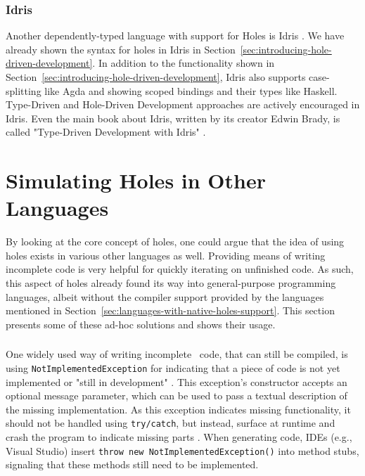 \subsubsection{Idris}
Another dependently-typed language with support for Holes is Idris \cite{brady_type-driven_2017}.
We have already shown the syntax for holes in Idris in Section~\ref{sec:introducing-hole-driven-development}.
In addition to the functionality shown in Section~\ref{sec:introducing-hole-driven-development}, Idris also supports case-splitting like Agda and showing scoped bindings and their types like Haskell.
Type-Driven and Hole-Driven Development approaches are actively encouraged in Idris.
Even the main book about Idris, written by its creator Edwin Brady, is called "Type-Driven Development with Idris" \cite{brady_type-driven_2017}.

\section{Simulating Holes in Other Languages}
\label{sec:simulating-holes}
By looking at the core concept of holes, one could argue that the idea of using holes exists in various other languages as well.
Providing means of writing incomplete code is very helpful for quickly iterating on unfinished code.
As such, this aspect of holes already found its way into general-purpose programming languages, albeit without the compiler support provided by the languages mentioned in Section~\ref{sec:languages-with-native-holes-support}.
This section presents some of these ad-hoc solutions and shows their usage.

\subsubsection{\CS}
One widely used way of writing incomplete \CS\ code, that can still be compiled, is using \texttt{NotImplementedException} \cite{microsoft_notimplementedexception_2020} for indicating that a piece of code is not yet implemented or "still in development" \cite{microsoft_notimplementedexception_2020}.
This exception's constructor accepts an optional message parameter, which can be used to pass a textual description of the missing implementation.
As this exception indicates missing functionality, it should not be handled using \texttt{try/catch}, but instead, surface at runtime and crash the program to indicate missing parts \cite{microsoft_notimplementedexception_2020}.
When generating code, IDEs (e.g., Visual Studio) insert \texttt{throw new NotImplementedException()} into method stubs, signaling that these methods still need to be implemented.

